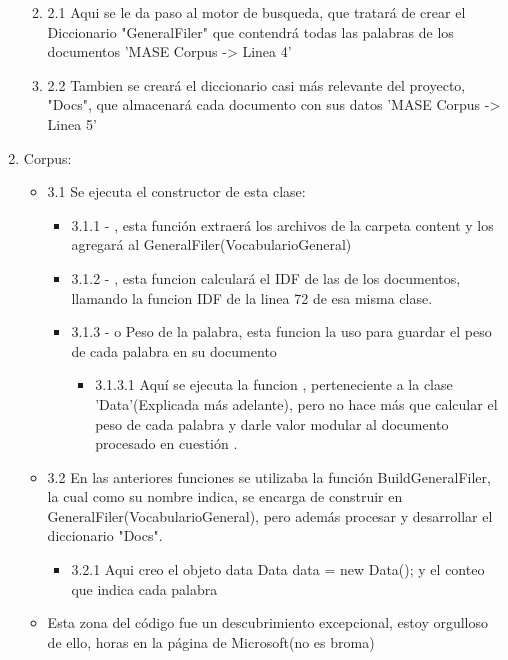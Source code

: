 \documentclass{article}
\begin{document}
\begin{enumerate}
\begin{enumerate}
\begin{itemize}
            \end{itemize}
            \item 2.1 Aqui se le da paso al motor de busqueda, que tratará de crear el Diccionario "GeneralFiler" que contendrá todas las palabras de los documentos 'MASE Corpus -> Linea 4'
            \item 2.2 Tambien se creará el diccionario casi más relevante del proyecto, "Docs", que almacenará cada documento con sus datos 'MASE Corpus -> Linea 5'
        \end{enumerate}
    \item Corpus:
        \begin{itemize}
            \item 3.1 Se ejecuta el constructor de esta clase:
            \begin{itemize}
                \item 3.1.1 - , esta función extraerá los archivos de la carpeta content y los agregará al GeneralFiler(VocabularioGeneral)
                \item 3.1.2 - , esta funcion calculará el IDF de las de los documentos, llamando la funcion IDF de la linea 72 de esa misma clase.
                \item 3.1.3 - o Peso de la palabra, esta funcion la uso para guardar el peso de cada palabra en su documento
                    \begin{itemize}
                        \item 3.1.3.1 Aquí se ejecuta la funcion , perteneciente a la clase 'Data'(Explicada más adelante), pero no hace más que calcular el peso de cada palabra y darle valor modular al documento procesado en cuestión .
                    \end{itemize}
            \end{itemize}
            \item 3.2 En las anteriores funciones se utilizaba la función BuildGeneralFiler, la cual como su nombre indica, se encarga de construir en GeneralFiler(VocabularioGeneral), pero además procesar y desarrollar el diccionario "Docs".
                \begin{itemize}
                    \item 3.2.1 Aqui creo el objeto data Data data = new Data(); y el conteo que indica cada palabra 
                \end{itemize}
            \item Esta zona del código fue un descubrimiento excepcional, estoy orgulloso de ello, horas en la página de Microsoft(no es broma)
            

\end{itemize}
\end{enumerate}
\end{document}
